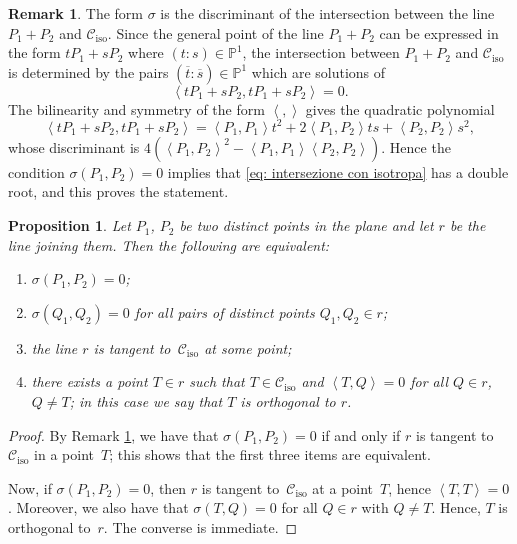 \documentclass{amsart}
\theoremstyle{plain}
\newtheorem{prop}[lemma]{Proposition}
\theoremstyle{definition}
\newtheorem{rmk}[lemma]{Remark}
\newcommand{\p}{\mathbb{P}}
\newcommand{\iso}{\mathcal{C}_{\mathrm{iso}}}
\newcommand{\scl}[2]{\left\langle {#1}, {#2} \right\rangle}
\begin{document}
\begin{rmk}\label{rmk: sigma discr}
The form $\sigma$ is the discriminant of the intersection between the line $P_1+P_2$ and $\iso$.
Since the general point of the line $P_1 + P_2$ can be expressed in the form
$t P_1 + sP_2$ where $(t:s) \in \p^1$, the intersection between $P_1+P_2$
and $\iso$ is determined by the pairs $( \overline t: \overline s)\in \p^1$ which are solutions of
$$
\scl{t P_1 + sP_2}{t P_1 + sP_2} =0.
$$
The bilinearity and symmetry of the form $\scl{}{}$ gives the quadratic polynomial
\begin{equation}\label{eq: intersezione con isotropa}
\scl{t P_1 + sP_2}{t P_1 + sP_2}= \scl{P_1}{P_1} t^2
+2\scl{P_1}{P_2} ts + \scl{P_2}{P_2}s^2,
\end{equation}
whose discriminant is $4 ( \scl{P_1}{P_2}^2 - \scl{P_1}{P_1} \scl{P_2}{P_2})$.
Hence the condition $\sigma(P_1,P_2)=0$ implies that \eqref{eq: intersezione con isotropa}
has a double root, and this proves the statement.
\end{rmk}

\begin{prop}
\label{proposition:sigma_tangency}
  Let $P_1$, $P_2$ be two distinct points in the plane and let $r$ be the line joining them.
  Then the following are equivalent:
  \begin{enumerate}
  \item $\sigma(P_1, P_2) = 0$;
  \item $\sigma(Q_1, Q_2) = 0$ for all pairs of distinct points $Q_1, Q_2 \in r$;
  \item the line $r$ is tangent to~$\iso$ at some point;
  \item there exists a point $T \in r$ such that  $T \in \iso$ and $\scl{T}{Q} = 0$ for all $Q \in r$, $Q \neq T$; in this case we say that $T$ is \emph{orthogonal} to $r$.
  \end{enumerate}
\end{prop}
\begin{proof}
  By Remark \ref{rmk: sigma discr}, we have that $\sigma(P_1, P_2) = 0$ if and only if $r$ is tangent to~$\iso$ in a point~$T$; this shows that the first three items are equivalent.

  Now, if $\sigma(P_1, P_2) = 0$, then $r$ is tangent to~$\iso$ at a point~$T$, hence $\scl{T}{T} = 0$. Moreover, we also have that $\sigma(T, Q) = 0$ for all $Q \in r$ with $Q \neq T$. Hence, $T$ is orthogonal to~$r$.
  The converse is immediate.
\end{proof}
\end{document}
